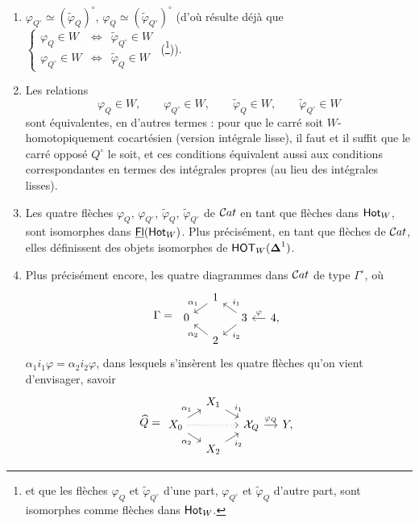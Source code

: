 \begin{enumerate}[label={}, leftmargin=2.5em]\itshape
\item[\circled{\textit{a}}] $\varphi_{Q^\circ}\simeq(\tilde{\varphi}_Q)^\circ$, $\varphi_Q\simeq(\tilde{\varphi}_{Q^\circ})^\circ$ (d'où résulte déjà que $\left\{\begin{array}{lcl}\varphi_Q\in W & \Longleftrightarrow & \tilde{\varphi}_{Q^\circ}\in W\\ \varphi_{Q^\circ}\in W & \Longleftrightarrow & \tilde{\varphi}_Q\in W\end{array}\right.$ (\footnote[90]{\upshape et que les flèches $\varphi_Q$ et $\tilde{\varphi}_{Q^\circ}$ d'une part, $\varphi_{Q^\circ}$ et $\tilde{\varphi}_Q$ d'autre part, sont isomorphes comme flèches dans $\mathsf{Hot}_W$.})).

\item[\circled{\textit{b}}] Les relations
\[
\varphi_Q\in W, \qquad \varphi_{Q^\circ}\in W, \qquad \tilde{\varphi}_Q\in W, \qquad \tilde{\varphi}_{Q^\circ}\in W
\]
sont équivalentes, en d'autres termes : pour que le carré soit $W$-homotopiquement cocartésien (version intégrale lisse), il faut et il suffit que le carré opposé $Q^\circ$ le soit, et ces conditions équivalent aussi aux conditions correspondantes en termes des intégrales propres (au lieu des intégrales lisses).

\item[\circled{\textit{c}}] Les quatre flèches $\varphi_Q$, $\varphi_{Q^\circ}$, $\tilde{\varphi}_Q$, $\tilde{\varphi}_{Q^\circ}$ de $\mathcal{C}at$ en tant que flèches dans $\mathsf{Hot}_W$, sont isomorphes dans $\underline{\mathsf{Fl}}(\mathsf{Hot}_W)$. Plus précisément, en tant que flèches de $\mathcal{C}at$,
elles définissent des objets isomorphes de $\mathsf{HOT}_W(\boldsymbol{\Delta}^1)$.

\item[\circled{\textit{d}}] Plus précisément encore, les quatre diagrammes dans $\mathcal{C}at$ de type $\Gamma^\circ$, où
\[
\Gamma = \;
\begin{tikzcd}[row sep=tiny, column sep=small]
 & 1 \arrow[dl, "\alpha_1"'] & & \\
0 & & 3 \arrow[ul, "i_1"'] \arrow[dl, "i_2"] & 4, \arrow[l, "\varphi"'] \\
 & 2 \arrow[ul, "\alpha_2"] & &
\end{tikzcd}
\]
$\alpha_1i_1\varphi=\alpha_2i_2\varphi$, dans lesquels s'insèrent les quatre flèches qu'on vient d'envisager, savoir
\[
\widehat{Q} = 
\begin{tikzcd}[row sep=tiny, column sep=small]
 & X_1 \arrow[dr, "i_1"] & & \\
X_0 \arrow[ur, "\alpha_1"] \arrow[dr, "\alpha_2"'] \arrow[rr, dotted] & & \sX_Q \arrow[r, "\varphi_Q"] & Y, \\
 & X_2 \arrow[ur, "i_2"'] & &
\end{tikzcd}
\]
\end{enumerate}

